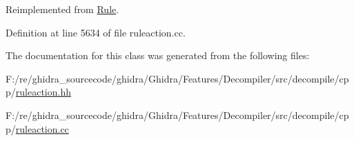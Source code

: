 Reimplemented from \mbox{\hyperlink{class_rule_a4023bfc7825de0ab866790551856d10e}{Rule}}.



Definition at line 5634 of file ruleaction.\+cc.



The documentation for this class was generated from the following files\+:\begin{DoxyCompactItemize}
\item 
F\+:/re/ghidra\+\_\+sourcecode/ghidra/\+Ghidra/\+Features/\+Decompiler/src/decompile/cpp/\mbox{\hyperlink{ruleaction_8hh}{ruleaction.\+hh}}\item 
F\+:/re/ghidra\+\_\+sourcecode/ghidra/\+Ghidra/\+Features/\+Decompiler/src/decompile/cpp/\mbox{\hyperlink{ruleaction_8cc}{ruleaction.\+cc}}\end{DoxyCompactItemize}
